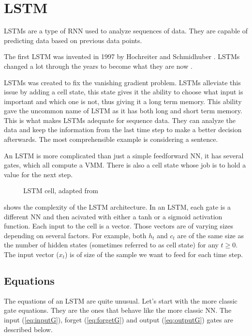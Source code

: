 \section{\acs{LSTM}}\label{sec:lstm}
\acfp{LSTM} are a type of \ac{RNN} used to analyze sequences of data. They are capable of predicting data based on previous data points.

The first \ac{LSTM} was invented in 1997 by Hochreiter and Schmidhuber \cite{firstLSTM}. \acp{LSTM} changed a lot through the years to become what they are now \cite{improvLSTM}.

\acp{LSTM} was created to fix the vanishing gradient problem. \acp{LSTM} alleviate this issue by adding a cell state, this state gives it the ability to choose what input is important and which one is not, thus giving it a long term memory. This ability gave the uncommon name of \acl{LSTM} as it has both long and short term memory. This is what makes \acp{LSTM} adequate for sequence data. They can analyze the data and keep the information from the last time step to make a better decision afterwards. The most comprehensible example is considering a sentence.

An \ac{LSTM} is more complicated than just a simple feedforward \acl{NN}, it has several gates, which all compute a \ac{VMM}. There is also a cell state whose job is to hold a value for the next step.

\begin{figure}[H]
  \centering
  
  \caption{\acs{LSTM} cell, adapted from \cite{wikiLSTM}}
  \label{fig:lstmCell}
\end{figure}

 shows the complexity of the \ac{LSTM} architecture. In an \ac{LSTM}, each gate is a different \ac{NN} and then acivated with either a \ac{tanh} or a sigmoid activation function. Each input to the cell is a vector.
Those vectors are of varying sizes depending on several factors. For example, both $h_t$ and $c_t$ are of the same size as the number of hidden states (sometimes referred to as cell state) for any $t\geq 0$.
The input vector ($x_t$) is of size of the sample we want to feed for each time step.

\subsection{Equations}

The equations of an LSTM are quite unusual.
Let's start with the more classic gate equations. They are the ones that behave like the more classic \ac{NN}.
The input (\cref{eq:inputG}), forget (\cref{eq:forgetG}) and output (\cref{eq:outputG}) gates are described below.


